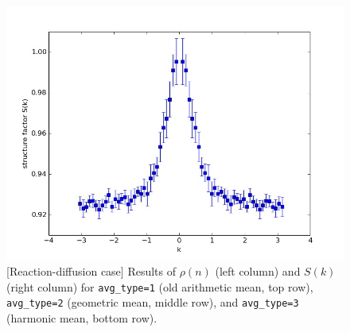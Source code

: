 \documentclass{article}
\begin{document}
\begin{figure}[ht!]
\includegraphics[width=0.5\linewidth]{fig1/react_Sk_avg3.jpg}
\caption{\label{fig_react_123}[Reaction-diffusion case] Results of $\rho(n)$ (left column) and $S(k)$ (right column) for \texttt{avg\_type=1} (old arithmetic mean, top row), \texttt{avg\_type=2} (geometric mean, middle row), and \texttt{avg\_type=3} (harmonic mean, bottom row).
}
\end{figure}
\end{document}
